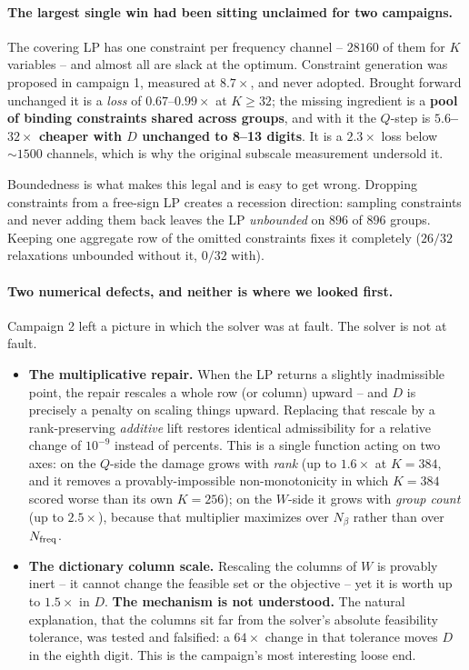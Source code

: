 \documentclass{article}
\numberwithin{equation}{section}   %
\begin{document}
\paragraph{The largest single win had been sitting unclaimed for two campaigns.}
The covering LP has one constraint per frequency channel -- $28160$ of them for $K$ variables --
and almost all are slack at the optimum. Constraint generation was proposed in campaign 1,
measured at $8.7\times$, and never adopted. Brought forward unchanged it is a {\em loss} of
$0.67$--$0.99\times$ at $K \ge 32$; the missing ingredient is a {\bf pool of binding constraints
shared across groups}, and with it the $Q$-step is {\bf $5.6$--$32\times$ cheaper with $D$
unchanged to 8--13 digits}. It is a $2.3\times$ loss below $\sim 1500$ channels, which is why the
original subscale measurement undersold it.

Boundedness is what makes this legal and is easy to get wrong. Dropping constraints from a
free-sign LP creates a recession direction: sampling constraints and never adding them back leaves
the LP {\em unbounded} on $896$ of $896$ groups. Keeping one aggregate row of the omitted
constraints fixes it completely ($26/32$ relaxations unbounded without it, $0/32$ with).

\paragraph{Two numerical defects, and neither is where we looked first.}
Campaign 2 left a picture in which the solver was at fault. The solver is not at fault.

\begin{itemize}
\item {\bf The multiplicative repair.} When the LP returns a slightly inadmissible point, the
 repair rescales a whole row (or column) upward -- and $D$ is precisely a penalty on scaling
 things upward. Replacing that rescale by a rank-preserving {\em additive} lift restores identical
 admissibility for a relative change of $10^{-9}$ instead of percents. This is a single function
 acting on two axes: on the $Q$-side the damage grows with {\em rank} (up to $1.6\times$ at
 $K = 384$, and it removes a provably-impossible non-monotonicity in which $K = 384$ scored worse
 than its own $K = 256$); on the $W$-side it grows with {\em group count} (up to $2.5\times$),
 because that multiplier maximizes over $N_\beta$ rather than over $N_{\rm freq}$.
\item {\bf The dictionary column scale.} Rescaling the columns of $W$ is provably inert -- it
 cannot change the feasible set or the objective -- yet it is worth up to $1.5\times$ in $D$.
 {\bf The mechanism is not understood.} The natural explanation, that the columns sit far from
 the solver's absolute feasibility tolerance, was tested and falsified: a $64\times$ change in
 that tolerance moves $D$ in the eighth digit. This is the campaign's most interesting loose end.
\end{itemize}
\end{document}
